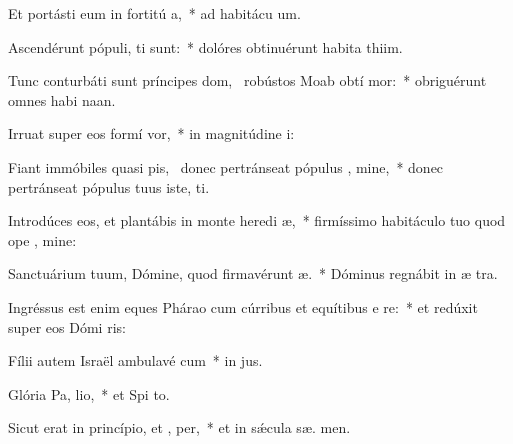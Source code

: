 \item Et portásti eum in fortitú a,~* ad habitácu  um.
\item Ascendérunt pópuli,  ti sunt:~* dolóres obtinuérunt habita thiim.
\item Tunc conturbáti sunt príncipes dom,~\pscross{} robústos Moab obtí mor:~* obriguérunt omnes habi naan.
\item Irruat super eos formí  vor,~* in magnitúdine  i:
\item Fiant immóbiles quasi pis,~\pscross{} donec pertránseat pópulus , mine,~* donec pertránseat pópulus tuus iste,  ti.
\item Introdúces eos, et plantábis in monte heredi æ,~* firmíssimo habitáculo tuo quod ope , mine:
\item Sanctuárium tuum, Dómine, quod firmavérunt  æ.~* Dóminus regnábit in æ  tra.
\item Ingréssus est enim eques Phárao cum cúrribus et equítibus e  re:~* et redúxit super eos Dómi  ris:
\item Fílii autem Israël ambulavé  cum~* in  jus.
\item Glória Pa,  lio,~* et Spi to.
\item Sicut erat in princípio, et ,  per,~* et in sǽcula sæ. men.
